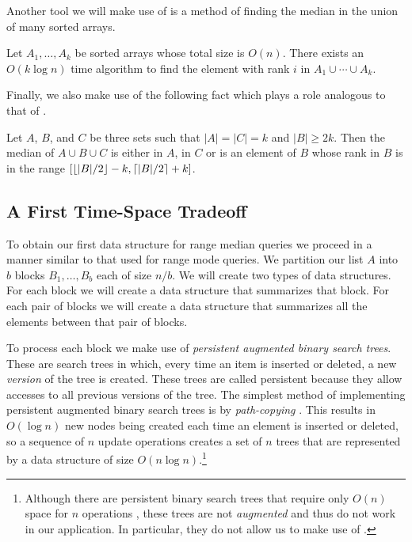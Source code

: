 \documentclass{njcarticle}
\begin{document}
Another tool we will make use of is a method of finding the median in
the union of many sorted arrays. 

\begin{lemma}
Let $A_1,\ldots,A_k$ be sorted arrays whose total size is $O(n)$.  There exists
an $O(k\log n)$ time algorithm to find the element with rank $i$ in 
$A_1\cup\cdots\cup A_k$.
\end{lemma}

Finally, we also make use of the following fact which plays a role
analogous to that of .

\begin{lemma}
Let $A$, $B$, and $C$ be three sets such that $|A|=|C|=k$ and
$|B|\ge 2k$.  Then the median of $A\cup B\cup C$ is either in $A$, in $C$
or is an element of $B$ whose rank in $B$ is in the range
$[\left\lfloor |B|/2 \right\rfloor-k,\left\lceil |B|/2 \right\rceil+k]$.
\end{lemma}


\subsection{A First Time-Space Tradeoff}

To obtain our first data structure for range median queries we proceed
in a manner similar to that used for range mode queries.  We partition
our list $A$ into $b$ blocks $B_1,\ldots,B_b$ each of size $n/b$.
We will create two types of data structures.  For each block we will
create a data structure that summarizes that block.  For each pair of
blocks we will create a data structure that summarizes all the
elements between that pair of blocks.

To process each block we make use of \emph{persistent augmented binary
search trees}.  These are search trees in which, every time an item is
inserted or deleted, a new \emph{version} of the tree is created.
These trees are called persistent because they allow accesses to all
previous versions of the tree.  The simplest method of implementing
persistent augmented binary search trees is by \emph{path-copying}
.  This results in $O(\log n)$ new nodes
being created each time an element is inserted or deleted, so a
sequence of $n$ update operations creates a set of $n$ trees that are
represented by a data structure of size $O(n\log
n)$.\footnote{Although there are persistent binary search trees that
require only $O(n)$ space for $n$ operations
, these
trees are not \emph{augmented} and thus do not work in our
application.  In particular, they do not allow us to make use of
.}
\end{document}
